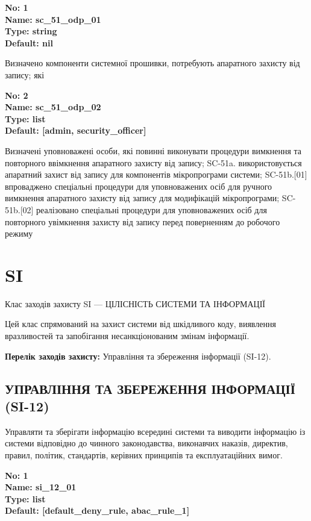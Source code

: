 \documentclass{article}
\begin{document}
\vspace{10pt}
{\footnotesize\bfseries
No: 1\\
Name: sc\_\allowbreak{}51\_\allowbreak{}odp\_\allowbreak{}01\\
Type: string\\
Default: nil
}

{\footnotesize Визначено компоненти системної прошивки, потребують апаратного захисту від запису; які}


{\footnotesize\bfseries
No: 2\\
Name: sc\_\allowbreak{}51\_\allowbreak{}odp\_\allowbreak{}02\\
Type: list\\
Default: [\textquotedbl{}admin\textquotedbl{}, \textquotedbl{}security\_\allowbreak{}officer\textquotedbl{}]
}

{\footnotesize Визначені уповноважені особи, які повинні виконувати процедури вимкнення та повторного ввімкнення апаратного захисту від запису; SC-51a. використовується апаратний захист від запису для компонентів мікропрограми системи; SC-51b.[01] впроваджено спеціальні процедури для уповноважених осіб для ручного вимкнення апаратного захисту від запису для модифікацій мікропрограми; SC-51b.[02] реалізовано спеціальні процедури для уповноважених осіб для повторного увімкнення захисту від запису перед поверненням до робочого режиму}




\section{SI}
Клас заходів захисту SI --- ЦІЛІСНІСТЬ СИСТЕМИ ТА ІНФОРМАЦІЇ

Цей клас спрямований на захист системи від шкідливого коду, виявлення вразливостей та запобігання несанкціонованим змінам інформації.

\textbf{Перелік заходів захисту:} Управління та збереження інформації (SI-12).

\subsection{УПРАВЛІННЯ ТА ЗБЕРЕЖЕННЯ ІНФОРМАЦІЇ (SI-12)}
Управляти та зберігати інформацію всередині системи та виводити інформацію із системи відповідно до чинного законодавства, виконавчих наказів, директив, правил, політик, стандартів, керівних принципів та експлуатаційних вимог.

\vspace{10pt}
{\footnotesize\bfseries
No: 1\\
Name: si\_\allowbreak{}12\_\allowbreak{}01\\
Type: list\\
Default: [\textquotedbl{}default\_\allowbreak{}deny\_\allowbreak{}rule\textquotedbl{}, \textquotedbl{}abac\_\allowbreak{}rule\_\allowbreak{}1\textquotedbl{}]
}
\end{document}
